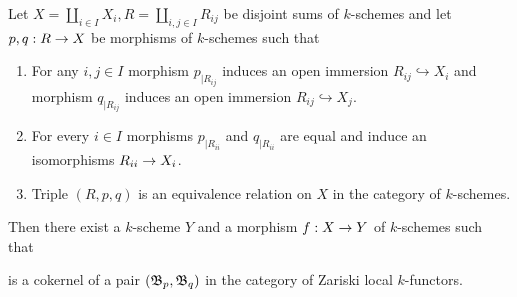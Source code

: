 \begin{lemma}\label{lemma:recollement}
Let $X = \coprod_{i\in I}X_i, R = \coprod_{i,j\in I}R_{ij}$ be disjoint sums of $k$-schemes and let $p,q:R\rightarrow X$ be morphisms of $k$-schemes such that
\begin{enumerate}[label=\emph{\textbf{(\roman*)}}, leftmargin=1.5em]
\item For any $i,j\in I$ morphism $p_{\mid R_{ij}}$ induces an open immersion $R_{ij}\hookrightarrow X_i$ and morphism $q_{\mid R_{ij}}$ induces an open immersion $R_{ij}\hookrightarrow X_j$.
\item For every $i\in I$ morphisms $p_{\mid R_{ii}}$ and $q_{\mid R_{ii}}$ are equal and induce an isomorphisms $R_{ii}\rightarrow X_i$.  
\item Triple $\left(R,p,q\right)$ is an equivalence relation on $X$ in the category of $k$-schemes.
\end{enumerate}
Then there exist a $k$-scheme $Y$ and a morphism $f:X\rightarrow Y$ of $k$-schemes such that
\begin{center}
\end{center}
is a cokernel of a pair $({\mathfrak B}_{p},{\mathfrak B}_{q})$ in the category of Zariski local $k$-functors.
\end{lemma}
